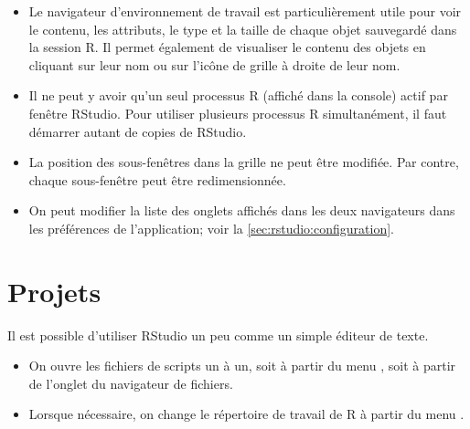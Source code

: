 \begin{itemize}
\item Le navigateur d'environnement de travail est particulièrement
  utile pour voir le contenu, les attributs, le type et la taille de
  chaque objet sauvegardé dans la session R. Il permet également de
  visualiser le contenu des objets en cliquant sur leur nom ou sur
  l'icône de grille à droite de leur nom.
\item Il ne peut y avoir qu'un seul processus R (affiché dans la
  console) actif par fenêtre RStudio. Pour utiliser plusieurs
  processus R simultanément, il faut démarrer autant de copies de
  RStudio.
\item La position des sous-fenêtres dans la grille ne peut être
  modifiée. Par contre, chaque sous-fenêtre peut être redimensionnée.
\item On peut modifier la liste des onglets affichés dans les deux
  navigateurs dans les préférences de l'application; voir la
  \autoref{sec:rstudio:configuration}.
\end{itemize}


\section{Projets}
\label{sec:rstudio:projets}

Il est possible d'utiliser RStudio un peu comme un simple éditeur de
texte.
\begin{itemize}
\item On ouvre les fichiers de scripts un à un, soit à partir du menu
  , soit à partir de l'onglet  du
  navigateur de fichiers.
\item Lorsque nécessaire, on change le répertoire de travail de R à
  partir du menu .
\end{itemize}

